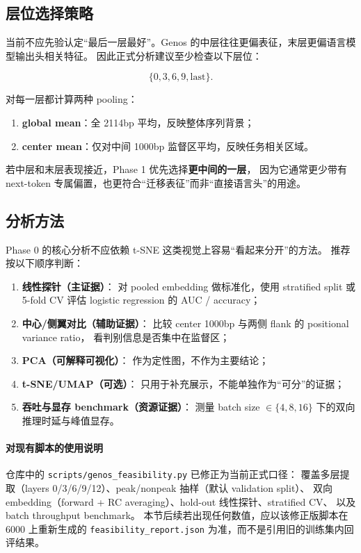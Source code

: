 \documentclass[11pt,a4paper]{ctexart}
\begin{document}
\subsection{层位选择策略}

当前不应先验认定“最后一层最好”。Genos 的中层往往更偏表征，末层更偏语言模型输出头相关特征。
因此正式分析建议至少检查以下层位：

\[
\{0, 3, 6, 9, \mathrm{last}\}.
\]

对每一层都计算两种 pooling：

\begin{enumerate}[leftmargin=2em]
  \item \textbf{global mean}：全 2114bp 平均，反映整体序列背景；
  \item \textbf{center mean}：仅对中间 1000bp 监督区平均，反映任务相关区域。
\end{enumerate}

若中层和末层表现接近，Phase 1 优先选择\textbf{更中间的一层}，
因为它通常更少带有 next-token 专属偏置，也更符合“迁移表征”而非“直接语言头”的用途。

\subsection{分析方法}

Phase 0 的核心分析不应依赖 t-SNE 这类视觉上容易“看起来分开”的方法。
推荐按以下顺序判断：

\begin{enumerate}[leftmargin=2em]
  \item \textbf{线性探针（主证据）}：
  对 pooled embedding 做标准化，使用 stratified split 或 5-fold CV 评估
  logistic regression 的 AUC / accuracy；
  \item \textbf{中心/侧翼对比（辅助证据）}：
  比较 center 1000bp 与两侧 flank 的 positional variance ratio，
  看判别信息是否集中在监督区；
  \item \textbf{PCA（可解释可视化）}：
  作为定性图，不作为主要结论；
  \item \textbf{t-SNE/UMAP（可选）}：
  只用于补充展示，不能单独作为“可分”的证据；
  \item \textbf{吞吐与显存 benchmark（资源证据）}：
  测量 batch size $\in \{4, 8, 16\}$ 下的双向推理时延与峰值显存。
\end{enumerate}

\paragraph{对现有脚本的使用说明}
仓库中的 \texttt{scripts/genos\_feasibility.py} 已修正为当前正式口径：
覆盖多层提取（layers 0/3/6/9/12）、peak/nonpeak 抽样（默认 validation split）、
双向 embedding（forward + RC averaging）、hold-out 线性探针、stratified CV、
以及 batch throughput benchmark。
本节后续若出现任何数值，应以该修正版脚本在 6000 上重新生成的
\texttt{feasibility\_report.json} 为准，而不是引用旧的训练集内回评结果。
\end{document}

